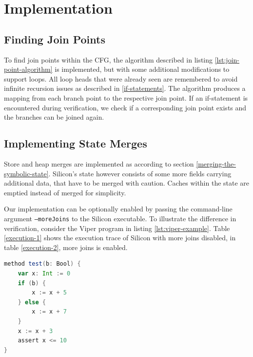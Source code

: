 \documentclass[11pt]{article}
\begin{document}
    \newpage
    \section{Implementation}

    \subsection{Finding Join Points}

    To find join points within the CFG, the algorithm described in listing \ref{lst:join-point-algorithm} is implemented,
    but with some additional modifications to support loops. All loop heads that
    were already seen are remembered to avoid infinite recursion issues as described
    in \ref{if-statements}.
    The algorithm produces a mapping from each branch point to the respective join point.
    If an if-statement is encountered during verification, we check if a 
    corresponding join point exists and the branches can be joined again.

    \subsection{Implementing State Merges}

    Store and heap merges are implemented as according to section \ref{merging-the-symbolic-state}.
    Silicon's state however consists of some more fields carrying additional data, that have to be merged with caution.
    Caches within the state are emptied instead of merged for simplicity.

    Our implementation can be optionally enabled by passing the command-line
    argument \texttt{--moreJoins} to the Silicon executable. To illustrate the difference
    in verification, consider the Viper program in listing \ref{lst:viper-example}.
    Table \ref{execution-1} shows the execution trace of Silicon with more joins disabled,
    in table \ref{execution-2}, more joins is enabled.

    \begin{lstlisting}[language=Scala, caption={An example Viper program.}, label={lst:viper-example}]
method test(b: Bool) {
    var x: Int := 0
    if (b) {
        x := x + 5
    } else {
        x := x + 7
    }
    x := x + 3
    assert x <= 10
}       
    \end{lstlisting}
\end{document}

